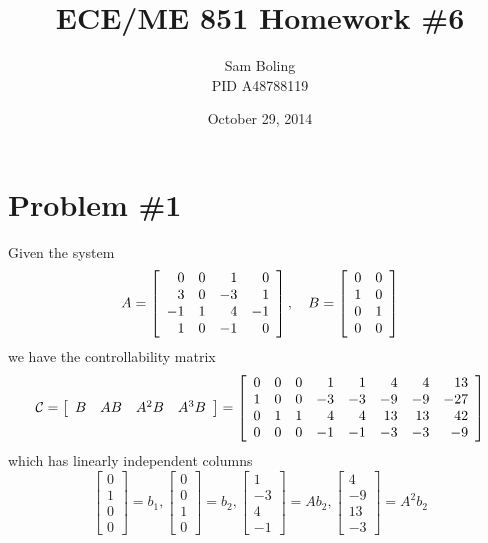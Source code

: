 \documentclass{article}
\title{ECE/ME 851 Homework \#6}
\date{October 29, 2014}
\author{Sam Boling \\ PID A48788119}
\begin{document}
\maketitle

\section*{Problem \#1}
Given the system
$$
A =
\left[\begin{array}{r r r r}
  0 & 0 &  1 &  0 \\
  3 & 0 & -3 &  1 \\
 -1 & 1 &  4 & -1 \\
  1 & 0 & -1 &  0
\end{array}\right], \quad
B =
\left[\begin{array}{c c}
  0 & 0 \\
  1 & 0 \\
  0 & 1 \\
  0 & 0
\end{array}\right]
$$
we have the controllability matrix
$$
\mathcal{C} =
\left[\begin{array}{c c c c}
B & A B & A^2 B & A^3 B
\end{array}\right] =
\left[\begin{array}{r r r r r r r r}
  0 &  0 &  0 &  1 &  1 &   4 &   4 &  13 \\
  1 &  0 &  0 & -3 & -3 &  -9 &  -9 & -27 \\
  0 &  1 &  1 &  4 &  4 &  13 &  13 &  42 \\
  0 &  0 &  0 & -1 & -1 &  -3 &  -3 &  -9
\end{array}\right]
$$
which has linearly independent columns
$$
\left[\begin{array}{r}
0 \\ 1 \\ 0 \\ 0
\end{array}\right] = b_1,
\left[\begin{array}{r}
0 \\ 0 \\ 1 \\ 0
\end{array}\right] = b_2,
\left[\begin{array}{r}
1 \\ -3 \\ 4 \\ -1
\end{array}\right] = Ab_2,
\left[\begin{array}{r}
4 \\ -9 \\ 13 \\ -3
\end{array}\right] = A^2 b_2
$$
\end{document}
